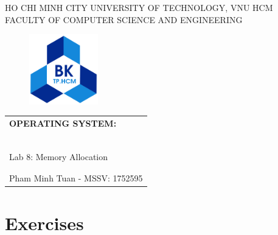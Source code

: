 \documentclass[a4paper, 11pt]{article}
\begin{document}
    \begin{titlepage}
        \begin{center}
            HO CHI MINH CITY UNIVERSITY OF TECHNOLOGY, VNU HCM \\
            FACULTY OF COMPUTER SCIENCE AND ENGINEERING
        \end{center}

        \vspace{1cm}

        \begin{figure}[h!]
            \begin{center}
                \includegraphics[width=3cm]{hcmut.png}
            \end{center}
        \end{figure}

        \vspace{1cm}

        \begin{center}
            \begin{tabular}{c}
                \multicolumn{1}{l}{\textbf{\LARGE OPERATING SYSTEM:}} \\
                ~~\\
                \hline
                \\
                \multicolumn{1}{l}{\LARGE Lab 8: Memory Allocation} \\
                \\
                \hline
                \\
                \hspace{5cm} Pham Minh Tuan - MSSV: 1752595
            \end{tabular}
        \end{center}
    \end{titlepage}

\newpage

\renewcommand*\contentsname{Contents:}
\tableofcontents

\newpage

\section{Exercises}
\end{document}
